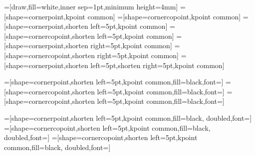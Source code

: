 
\makeatother


=[draw,fill=white,inner sep=1pt,minimum height=4mm]
=[shape=cornerpoint,kpoint common]
=[shape=cornercopoint,kpoint common]
=[shape=cornerpoint,shorten left=5pt,kpoint common]
=[shape=cornercopoint,shorten left=5pt,kpoint common]
=[shape=cornerpoint,shorten right=5pt,kpoint common]
=[shape=cornercopoint,shorten right=5pt,kpoint common]
=[shape=cornerpoint,shorten left=5pt,shorten right=5pt,kpoint common]

=[shape=cornerpoint,shorten left=5pt,kpoint common,fill=black,font=\color{white}]
=[shape=cornercopoint,shorten left=5pt,kpoint common,fill=black,font=\color{white}]
=[shape=cornercopoint,shorten left=5pt,kpoint common,fill=black,font=\color{white}]

=[shape=cornerpoint,shorten left=5pt,kpoint common,fill=black, doubled,font=\color{white}]
=[shape=cornercopoint,shorten left=5pt,kpoint common,fill=black, doubled,font=\color{white}]
=[shape=cornercopoint,shorten left=5pt,kpoint common,fill=black, doubled,font=\color{white}] 


